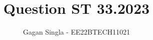 \documentclass[journal,12pt,twocolumn]{IEEEtran}
\theoremstyle{remark}
\begin{document}
%




\vspace{3cm}

\title{
Question ST 33.2023
}
\author{Gagan Singla - EE22BTECH11021}	


%
%
%

% 
%



% 
\end{document}
